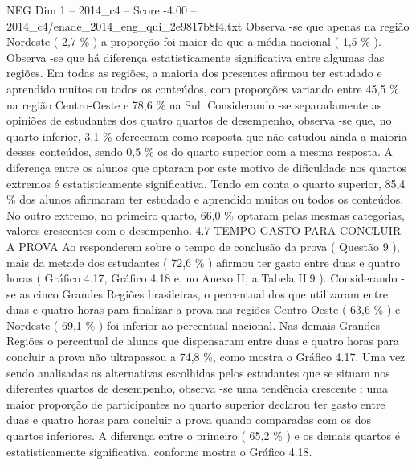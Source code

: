 \begin{textsample}{NEG Dim 1 – 2014\_c4 – Score -4.00 – 2014\_c4/enade\_2014\_eng\_qui\_2e9817b8f4.txt}
Observa -se que apenas na região Nordeste ( 2,7 \% ) a proporção foi maior do que a média nacional ( 1,5 \% ).
Observa -se que há diferença estatisticamente significativa entre algumas das regiões.
Em todas as regiões, a maioria dos presentes afirmou ter estudado e aprendido muitos ou todos os conteúdos, com proporções variando entre 45,5 \% na região Centro-Oeste e 78,6 \% na Sul.
Considerando -se separadamente as opiniões de estudantes dos quatro quartos de desempenho, observa -se que, no quarto inferior, 3,1 \% ofereceram como resposta que não estudou ainda a maioria desses conteúdos, sendo 0,5 \% os do quarto superior com a mesma resposta.
A diferença entre os alunos que optaram por este motivo de dificuldade nos quartos extremos é estatisticamente significativa.
Tendo em conta o quarto superior, 85,4 \% dos alunos afirmaram ter estudado e aprendido muitos ou todos os conteúdos.
No outro extremo, no primeiro quarto, 66,0 \% optaram pelas mesmas categorias, valores crescentes com o desempenho. 4.7 TEMPO GASTO PARA CONCLUIR A PROVA Ao responderem sobre o tempo de conclusão da prova ( Questão 9 ), mais da metade dos estudantes ( 72,6 \% ) afirmou ter gasto entre duas e quatro horas ( Gráfico 4.17, Gráfico 4.18 e, no Anexo II, a Tabela II.9 ).
Considerando -se as cinco Grandes Regiões brasileiras, o percentual dos que utilizaram entre duas e quatro horas para finalizar a prova nas regiões Centro-Oeste ( 63,6 \% ) e Nordeste ( 69,1 \% ) foi inferior ao percentual nacional.
Nas demais Grandes Regiões o percentual de alunos que dispensaram entre duas e quatro horas para concluir a prova não ultrapassou a 74,8 \%, como mostra o Gráfico 4.17.
Uma vez sendo analisadas as alternativas escolhidas pelos estudantes que se situam nos diferentes quartos de desempenho, observa -se uma tendência crescente : uma maior proporção de participantes no quarto superior declarou ter gasto entre duas e quatro horas para concluir a prova quando comparadas com os dos quartos inferiores.
A diferença entre o primeiro ( 65,2 \% ) e os demais quartos é estatisticamente significativa, conforme mostra o Gráfico 4.18.

\end{textsample}
